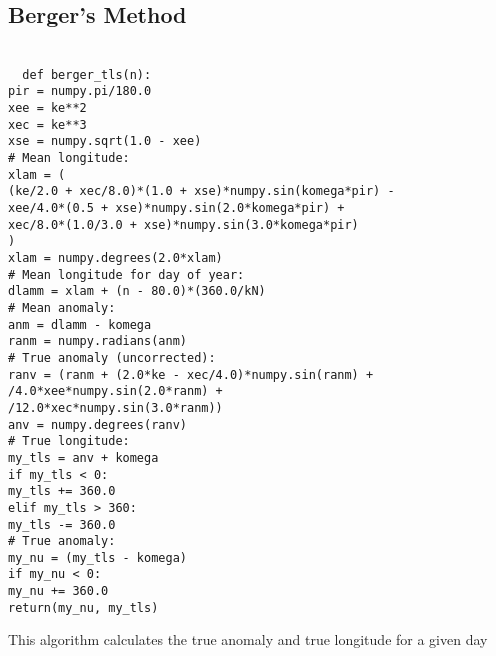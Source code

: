 \subsection{Berger's Method}
\label{app:berger}
\texttt{ \\
~~def berger_tls(n):\\
 \indent pir = numpy.pi/180.0 \\
 \indent xee = ke**2 \\
 \indent xec = ke**3 \\
 \indent xse = numpy.sqrt(1.0 - xee) \\
 \indent \# Mean longitude: \\
 \indent xlam = ( \\
 \indent \indent (ke/2.0 + xec/8.0)*(1.0 + xse)*numpy.sin(komega*pir) -  \\
 \indent \indent xee/4.0*(0.5 + xse)*numpy.sin(2.0*komega*pir) +  \\
 \indent \indent xec/8.0*(1.0/3.0 + xse)*numpy.sin(3.0*komega*pir) \\
 \indent \indent ) \\
 \indent xlam = numpy.degrees(2.0*xlam) \\
 \indent \# Mean longitude for day of year: \\
 \indent dlamm = xlam + (n - 80.0)*(360.0/kN) \\
 \indent \# Mean anomaly: \\
 \indent anm = dlamm - komega \\
 \indent ranm = numpy.radians(anm) \\
 \indent \# True anomaly (uncorrected): \\
 \indent ranv = (ranm + (2.0*ke - xec/4.0)*numpy.sin(ranm) +  \\
 \indent {}/4.0*xee*numpy.sin(2.0*ranm) +  \\
 \indent {}/12.0*xec*numpy.sin(3.0*ranm)) \\
 \indent anv = numpy.degrees(ranv) \\
 \indent \# True longitude: \\
 \indent my\_tls = anv + komega \\
 \indent if my\_tls < 0: \\
 \indent \indent my\_tls += 360.0 \\
 \indent elif my\_tls > 360: \\
 \indent \indent my\_tls -= 360.0 \\
 \indent \# True anomaly: \\
 \indent my\_nu = (my\_tls - komega) \\
 \indent if my\_nu < 0: \\
 \indent \indent my\_nu += 360.0 \\
 \indent return(my\_nu, my\_tls) \\
}

This algorithm calculates the true anomaly and true longitude for a given day